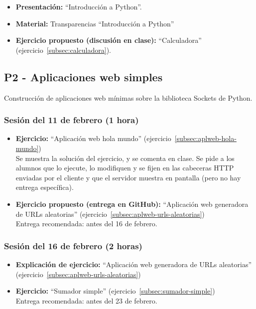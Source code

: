 \documentclass[a4paper,12pt]{article}
\begin{document}
\begin{itemize}
\item \textbf{Presentación:} ``Introducción a Python''.
\item \textbf{Material:} Transparencias ``Introducción a Python''
\item \textbf{Ejercicio propuesto (discusión en clase):} ``Calculadora'' (ejercicio~\ref{subsec:calculadora}).
\end{itemize}


\subsection{P2 - Aplicaciones web simples}

Construcción de aplicaciones web mínimas sobre la biblioteca Sockets de Python.

\subsubsection{Sesión del 11 de febrero (1 hora)}

\begin{itemize}
 \item \textbf{Ejercicio:} ``Aplicación web hola mundo'' (ejercicio~\ref{subsec:aplweb-hola-mundo}) \\
   Se muestra la solución del ejercicio, y se comenta en clase. Se pide a los alumnos que lo ejecute, lo modifiquen y se fijen en las cabeceras HTTP enviadas por el cliente y que el servidor muestra en pantalla (pero no hay entrega específica).
 \item \textbf{Ejercicio propuesto (entrega en GitHub):} ``Aplicación web generadora de URLs aleatorias'' (ejercicio~\ref{subsec:aplweb-urls-aleatorias}) \\
   Entrega recomendada: antes del 16 de febrero.
\end{itemize}

\subsubsection{Sesión del 16 de febrero (2 horas)}

\begin{itemize}
 \item \textbf{Explicación de ejercicio:} ``Aplicación web generadora de URLs aleatorias'' (ejercicio~\ref{subsec:aplweb-urls-aleatorias})
 \item \textbf{Ejercicio:} ``Sumador simple'' (ejercicio~\ref{subsec:sumador-simple}) \\
  Entrega recomendada: antes del 23 de febrero.
\end{itemize}
\end{document}
